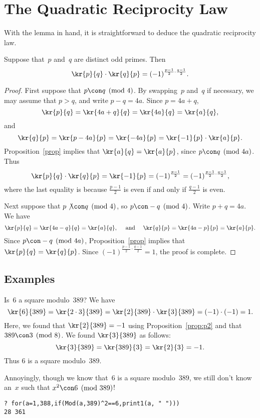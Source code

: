 \documentclass[11pt]{report}
\begin{document}
\section{The Quadratic Reciprocity Law}
With the lemma in hand, it is straightforward to deduce the quadratic
reciprocity law.
\begin{theorem}[Gauss]\label{thm:recip}
  Suppose that~$p$ and~$q$ are distinct odd primes.  Then
  $$\kr{p}{q}\cdot \kr{q}{p} = (-1)^{\frac{p-1}{2}\cdot \frac{q-1}{2}}.$$
\end{theorem}
\begin{proof}
  First suppose that $p\con q\pmod{4}$.  By swapping~$p$ and~$q$ if
  necessary, we may assume that $p>q$, and write $p-q=4a$.
  Since $p=4a+q$,
  $$\kr{p}{q} = \kr{4a+q}{q} = \kr{4a}{q} = \kr{a}{q},$$
  and
  $$\kr{q}{p} = \kr{p-4a}{p} = \kr{-4a}{p} = \kr{-1}{p}\cdot \kr{a}{p}.$$
  Proposition~\ref{prop} implies that
  $\kr{a}{q} = \kr{a}{p}$, since $p\con q\pmod{4a}$.  Thus
  $$\kr{p}{q}\cdot\kr{q}{p} = \kr{-1}{p} = (-1)^{\frac{p-1}{2}}
    = (-1)^{\frac{p-1}{2}\cdot \frac{q-1}{2}},$$
  where the last equality is because $\frac{p-1}{2}$ is even
  if and only if $\frac{q-1}{2}$ is even.

  Next suppose that $p\not\con q\pmod{4}$, so $p\con -q\pmod{4}$.
  Write $p+q=4a$.  We have
  $$\kr{p}{q} = \kr{4a-q}{q} = \kr{a}{q},
    \quad\text{ and }\quad
    \kr{q}{p} = \kr{4a-p}{p} = \kr{a}{p}.$$
  Since $p\con -q\pmod{4a}$, Proposition~\ref{prop}
  implies that $\kr{p}{q}=\kr{q}{p}$.
  Since $(-1)^{\frac{p-1}{2}\cdot \frac{q-1}{2}}=1$, the
  proof is complete.
\end{proof}



\subsection{Examples}
\begin{example}
  Is~$6$ a square modulo~$389$?
  We have
  $$\kr{6}{389} = \kr{2\cdot 3}{389}
    =\kr{2}{389}\cdot \kr{3}{389}
    = (-1)\cdot(-1)= 1.$$
  Here, we found that $\kr{2}{389} = -1$ using Proposition~\ref{prop:p2}
  and that $389\con 3\pmod{8}$.  We found $\kr{3}{389}$ as follows:
  $$\kr{3}{389} = \kr{389}{3} = \kr{2}{3}=-1.$$ Thus $6$ is a square
  modulo~$389$.

  Annoyingly, though we know that~$6$ is a square modulo~$389$, we still
  don't know an~$x$ such that $x^2\con 6\pmod{389}$!
  \begin{verbatim}
? for(a=1,388,if(Mod(a,389)^2==6,print1(a, " ")))
28 361
\end{verbatim}
\end{example}
\end{document}
